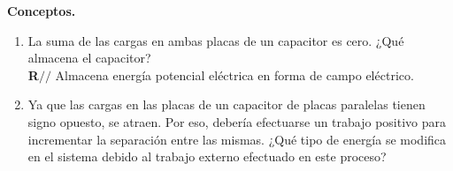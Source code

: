 \begin{mdframed}[style=warning]
	\begin{ejercicio}
		\textbf{Conceptos.}
		\begin{enumerate}
			\item La suma de las cargas en ambas placas de un capacitor es cero. ¿Qué almacena el capacitor? \\
			\textbf{R$//$} Almacena energía potencial eléctrica en forma de campo eléctrico.
			\item Ya que las cargas en las placas de un capacitor de placas paralelas tienen signo opuesto, se atraen. Por eso, debería efectuarse un trabajo positivo para incrementar la separación entre las mismas. ¿Qué tipo de energía se modifica en el sistema debido al trabajo externo efectuado en este proceso?
		\end{enumerate}
	\end{ejercicio}
\end{mdframed}






